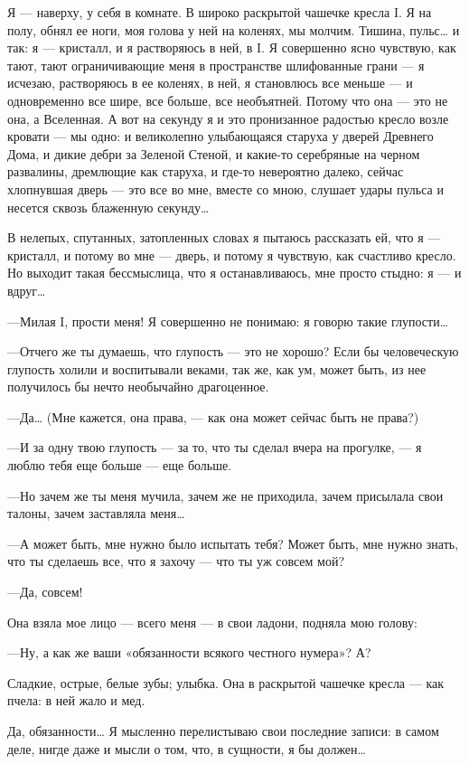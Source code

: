 \documentclass[11pt,openany]{book}
\begin{document}
Я --- наверху, у себя в комнате. В широко раскрытой чашечке кресла I. Я на полу, обнял ее ноги, моя голова у ней на коленях, мы молчим. Тишина, пульс\ldots{} и так: я --- кристалл, и я растворяюсь в ней, в I. Я совершенно ясно чувствую, как тают, тают ограничивающие меня в пространстве шлифованные грани --- я исчезаю, растворяюсь в ее коленях, в ней, я становлюсь все меньше --- и одновременно все шире, все больше, все необъятней. Потому что она --- это не она, а Вселенная. А вот на секунду я и это пронизанное радостью кресло возле кровати --- мы одно: и великолепно улыбающаяся старуха у дверей Древнего Дома, и дикие дебри за Зеленой Стеной, и какие-то серебряные на черном развалины, дремлющие как старуха, и где-то невероятно далеко, сейчас хлопнувшая дверь --- это все во мне, вместе со мною, слушает удары пульса и несется сквозь блаженную секунду\ldots{}

В нелепых, спутанных, затопленных словах я пытаюсь рассказать ей, что я --- кристалл, и потому во мне --- дверь, и потому я чувствую, как счастливо кресло. Но выходит такая бессмыслица, что я останавливаюсь, мне просто стыдно: я --- и вдруг\ldots{}

---Милая I, прости меня! Я совершенно не понимаю: я говорю такие глупости\ldots{}

---Отчего же ты думаешь, что глупость --- это не хорошо? Если бы человеческую глупость холили и воспитывали веками, так же, как ум, может быть, из нее получилось бы нечто необычайно драгоценное.

---Да\ldots{} (Мне кажется, она права, --- как она может сейчас быть не права?)

---И за одну твою глупость --- за то, что ты сделал вчера на прогулке, --- я люблю тебя еще больше --- еще больше.

---Но зачем же ты меня мучила, зачем же не приходила, зачем присылала свои талоны, зачем заставляла меня\ldots{}

---А может быть, мне нужно было испытать тебя? Может быть, мне нужно знать, что ты сделаешь все, что я захочу --- что ты уж совсем мой?

---Да, совсем!

Она взяла мое лицо --- всего меня --- в свои ладони, подняла мою голову:

---Ну, а как же ваши «обязанности всякого честного нумера»? А?

Сладкие, острые, белые зубы; улыбка. Она в раскрытой чашечке кресла --- как пчела: в ней жало и мед.

Да, обязанности\ldots{} Я мысленно перелистываю свои последние записи: в самом деле, нигде даже и мысли о том, что, в сущности, я бы должен\ldots{}
\end{document}
